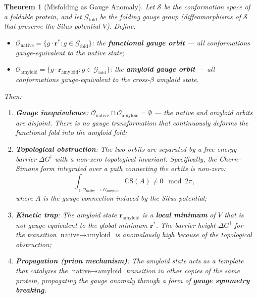 \documentclass[12pt,a4paper]{article}
\newtheorem{theorem}{Theorem}[section]
\theoremstyle{remark}
\newcommand{\G}{\mathcal{G}}
\newcommand{\Sstruct}{\mathcal{S}}
\begin{document}
\begin{theorem}[Misfolding as Gauge Anomaly]
\label{thm:misfold-gauge}
Let $\Sstruct$ be the conformation space of a foldable protein, and let $\G_{\text{fold}}$ be the folding gauge group (diffeomorphisms of $\Sstruct$ that preserve the Situs potential $V$).
Define:
\begin{itemize}[leftmargin=*]
    \item $\mathcal{O}_{\text{native}} = \{g \cdot \mathbf{r}^* : g \in \G_{\text{fold}}\}$: the \textbf{functional gauge orbit} — all conformations gauge-equivalent to the native state;
    \item $\mathcal{O}_{\text{amyloid}} = \{g \cdot \mathbf{r}_{\text{amyloid}} : g \in \G_{\text{fold}}\}$: the \textbf{amyloid gauge orbit} — all conformations gauge-equivalent to the cross-$\beta$ amyloid state.
\end{itemize}
Then:
\begin{enumerate}[leftmargin=*,label=(\roman*)]
    \item \textbf{Gauge inequivalence}: $\mathcal{O}_{\text{native}} \cap \mathcal{O}_{\text{amyloid}} = \emptyset$ — the native and amyloid orbits are disjoint. There is no gauge transformation that continuously deforms the functional fold into the amyloid fold;
    \item \textbf{Topological obstruction}: The two orbits are separated by a free-energy barrier $\Delta G^\ddagger$ with a non-zero topological invariant. Specifically, the Chern--Simons form integrated over a path connecting the orbits is non-zero:
    \begin{equation}
        \int_{\gamma: \mathcal{O}_{\text{native}} \to \mathcal{O}_{\text{amyloid}}} \text{CS}(A) \neq 0 \mod 2\pi,
    \end{equation}
    where $A$ is the gauge connection induced by the Situs potential;
    \item \textbf{Kinetic trap}: The amyloid state $\mathbf{r}_{\text{amyloid}}$ is a \textbf{local minimum} of $V$ that is \emph{not} gauge-equivalent to the global minimum $\mathbf{r}^*$. The barrier height $\Delta G^\ddagger$ for the transition $\text{native} \to \text{amyloid}$ is anomalously high because of the topological obstruction;
    \item \textbf{Propagation (prion mechanism)}: The amyloid state acts as a template that catalyzes the $\text{native} \to \text{amyloid}$ transition in other copies of the same protein, propagating the gauge anomaly through a form of \textbf{gauge symmetry breaking}.
\end{enumerate}
\end{theorem}
\end{document}

